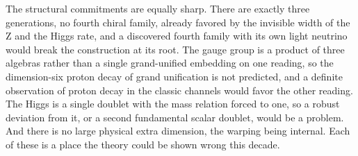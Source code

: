 The structural commitments are equally sharp. There are exactly three generations, no fourth chiral family, already
favored by the invisible width of the Z and the Higgs rate, and a discovered fourth family with its own light neutrino
would break the construction at its root. The gauge group is a product of three algebras rather than a single
grand-unified embedding on one reading, so the dimension-six proton decay of grand unification is not predicted, and a
definite observation of proton decay in the classic channels would favor the other reading. The Higgs is a single doublet
with the mass relation forced to one, so a robust deviation from it, or a second fundamental scalar doublet, would be a
problem. And there is no large physical extra dimension, the warping being internal. Each of these is a place the theory
could be shown wrong this decade.
